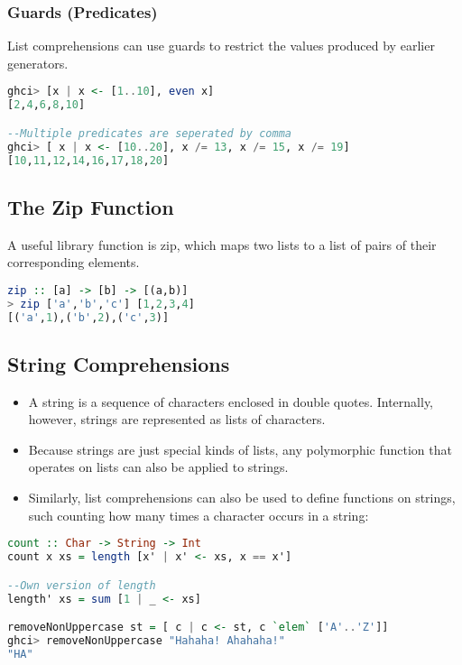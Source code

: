 \hypertarget{guards}{%
\subsubsection{Guards (Predicates)}\label{guards}}

List comprehensions can use guards to restrict the values produced by
earlier generators.

\begin{lstlisting}[language=Haskell]
ghci> [x | x <- [1..10], even x]
[2,4,6,8,10]

--Multiple predicates are seperated by comma
ghci> [ x | x <- [10..20], x /= 13, x /= 15, x /= 19]  
[10,11,12,14,16,17,18,20] 
\end{lstlisting}

\hypertarget{the-zip-function}{%
\subsection{The Zip Function}\label{the-zip-function}}

A useful library function is zip, which maps two lists to a list of
pairs of their corresponding elements.

\begin{lstlisting}[language=Haskell]
zip :: [a] -> [b] -> [(a,b)]
> zip ['a','b','c'] [1,2,3,4]
[('a',1),('b',2),('c',3)]
\end{lstlisting}

\clearpage
\hypertarget{string-comprehensions}{%
\subsection{String Comprehensions}\label{string-comprehensions}}

\begin{itemize}
\tightlist
\item
  A string is a sequence of characters enclosed in double quotes.
  Internally, however, strings are represented as lists of characters.
\item
  Because strings are just special kinds of lists, any polymorphic
  function that operates on lists can also be applied to strings.
\item
  Similarly, list comprehensions can also be used to define functions on
  strings, such counting how many times a character occurs in a string:
\end{itemize}

\begin{lstlisting}[language=Haskell]
count :: Char -> String -> Int
count x xs = length [x' | x' <- xs, x == x']

--Own version of length
length' xs = sum [1 | _ <- xs]   

removeNonUppercase st = [ c | c <- st, c `elem` ['A'..'Z']] 
ghci> removeNonUppercase "Hahaha! Ahahaha!"  
"HA"
\end{lstlisting}

\clearpage